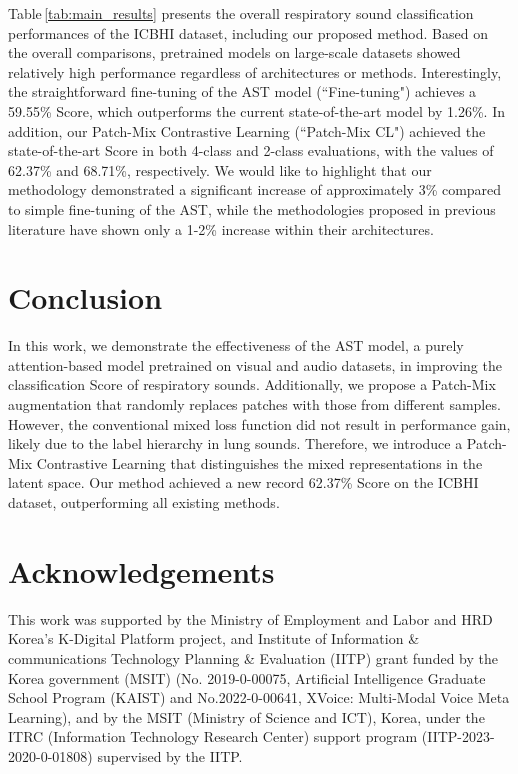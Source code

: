 \documentclass{INTERSPEECH2023}
\begin{document}
Table\,\ref{tab:main_results} presents the overall respiratory sound classification performances of the ICBHI dataset, including our proposed method. 
Based on the overall comparisons, pretrained models on large-scale datasets showed relatively high performance regardless of architectures or methods.
Interestingly, the straightforward fine-tuning of the AST model (``Fine-tuning") achieves a 59.55\% Score, which outperforms the current state-of-the-art model \cite{nguyen2022lung} by 1.26\%. 
In addition, our Patch-Mix Contrastive Learning (``Patch-Mix CL") achieved the state-of-the-art Score in both 4-class and 2-class evaluations, with the values of 62.37\% and 68.71\%, respectively.
We would like to highlight that our methodology demonstrated a significant increase of approximately 3\% compared to simple fine-tuning of the AST, while the methodologies proposed in previous literature have shown only a 1-2\% increase within their architectures. 
%
 

\vspace{-3pt}
\section{Conclusion}
\vspace{-1pt}


In this work, we demonstrate the effectiveness of the AST model, a purely attention-based model pretrained on visual and audio datasets, in improving the classification Score of respiratory sounds. 
Additionally, we propose a Patch-Mix augmentation that randomly replaces patches with those from different samples.
However, the conventional mixed loss function did not result in performance gain, likely due to the label hierarchy in lung sounds. Therefore, we introduce a Patch-Mix Contrastive Learning that distinguishes the mixed representations in the latent space.
Our method achieved a new record 62.37\% Score on the ICBHI dataset, outperforming all existing methods.



%
 
\vspace{-3pt}
\section{Acknowledgements}
\vspace{-1pt}
This work was supported by the Ministry of Employment and Labor and HRD Korea's K-Digital Platform project, and Institute of Information \& communications Technology Planning \& Evaluation (IITP) grant funded by the Korea government (MSIT) (No. 2019-0-00075, Artificial Intelligence Graduate School Program (KAIST) and No.2022-0-00641, XVoice: Multi-Modal Voice Meta Learning), and by the MSIT (Ministry of Science and ICT), Korea, under the ITRC (Information Technology Research Center) support program (IITP-2023-2020-0-01808) supervised by the IITP.









\end{document}
